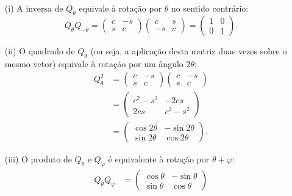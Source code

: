 \begin{itemize}
\item[(i)] A inversa de $Q_\theta$ equivale à rotação por $\theta$ no sentido contrário:
  \begin{equation*}
    Q_\theta Q_{-\theta} = 
    \begin{pmatrix}
       c&-s\\ 
       s&c
    \end{pmatrix}
    \begin{pmatrix}
       c&s\\
       -s & c
    \end{pmatrix}
    =
    \begin{pmatrix}
       1 & 0\\
       0 & 1
    \end{pmatrix}.
  \end{equation*}
  \item[(ii)] O quadrado de $Q_\theta$ (ou seja, a aplicação desta matriz duas vezes sobre o mesmo vetor) equivale à rotação por um ângulo $2\theta$:
    \begin{align*}
      Q_{\theta}^2 &= 
      \begin{pmatrix}
         c & -s\\
         s & c
      \end{pmatrix}
      \begin{pmatrix}
         c & -s\\
         s & c
      \end{pmatrix}
      \\
      & = 
      \begin{pmatrix}
         c^2-s^2 & -2cs\\
         2cs & c^2-s^2
      \end{pmatrix}
      \\
      & = 
      \begin{pmatrix}
         \cos{2\theta} & -\sin{2\theta}\\
         \sin{2\theta} & \cos{2\theta}
      \end{pmatrix}.
    \end{align*}
  \item[(iii)] O produto de $Q_\theta$ e $Q_\varphi$ é equivalente à rotação por $\theta+\varphi$:
  \begin{align*}
     Q_{\theta}Q_\varphi &=
     \begin{pmatrix}
        \cos{\theta} & -\sin{\theta}\\
        \sin{\theta} & \cos{\theta}
     \end{pmatrix}

\end{align*}
\end{itemize}
